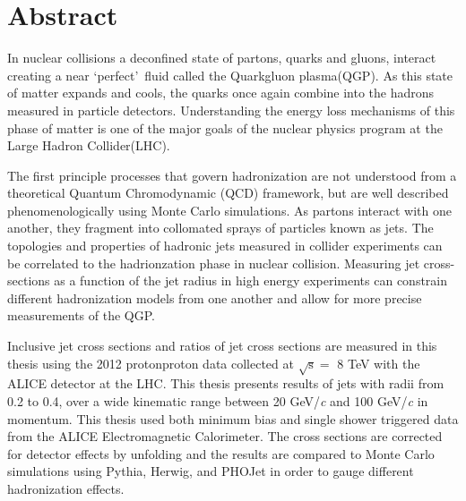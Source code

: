 \chapter*{Abstract}\label{ch:abstract}
In nuclear collisions a deconfined state of partons, quarks and gluons, interact creating a near \lq perfect\rq \, fluid called the Quark\textendash gluon plasma(QGP).  As this state of matter expands and cools, the quarks once again combine into the hadrons measured in particle detectors.  Understanding the energy loss mechanisms of this phase of matter is one of the major goals of the nuclear physics program at the Large Hadron Collider(LHC).  

The first principle processes that govern hadronization are not understood from a theoretical Quantum Chromodynamic (QCD) framework, but are well described phenomenologically using Monte Carlo simulations.  
As partons interact with one another, they fragment into collomated sprays of particles known as jets.  The topologies and properties of hadronic jets measured in collider experiments can be correlated to the hadrionzation phase in nuclear collision.   Measuring  jet cross-sections as a function of the jet radius in high energy experiments can constrain different hadronization models from one another and allow for more precise measurements of the QGP.

Inclusive jet cross sections and ratios of jet cross sections are measured in this thesis using the 2012 proton\textendash proton data collected at $ \sqrt{ \mathrm{s} } = $ 8 TeV with the ALICE detector at the LHC.  This thesis presents results of jets with radii from 0.2 to 0.4, over a wide kinematic range between 20 GeV/\textit{c} and 100 GeV/\textit{c} in momentum.  This thesis used both minimum bias and single shower triggered data from the ALICE Electromagnetic Calorimeter.  The cross sections are corrected for detector effects by unfolding and the results are compared to Monte Carlo simulations using Pythia, Herwig, and PHOJet in order to gauge different hadronization effects.